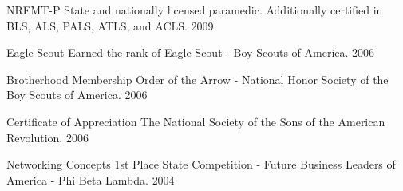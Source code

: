 
\begin{cvhonors}

  \cvhonor
    {NREMT-P} %
    {State and nationally licensed paramedic. Additionally certified in BLS, ALS, PALS, ATLS, and ACLS.} %
    {}
    {2009} %

  \cvhonor
    {Eagle Scout} %
    {Earned the rank of Eagle Scout - Boy Scouts of America.} %
    {}
    {2006} %

  \cvhonor
   {Brotherhood Membership} %
    {Order of the Arrow - National Honor Society of the Boy Scouts of America.} %
    {}
    {2006} %
    
  \cvhonor
   {Certificate of Appreciation} %
    {The National Society of the Sons of the American Revolution.} %
    {}
    {2006} %

  \cvhonor
   {Networking Concepts} %
    {1st Place State Competition - Future Business Leaders of America - Phi Beta Lambda.} %
    {}
    {2004} %

\end{cvhonors}


